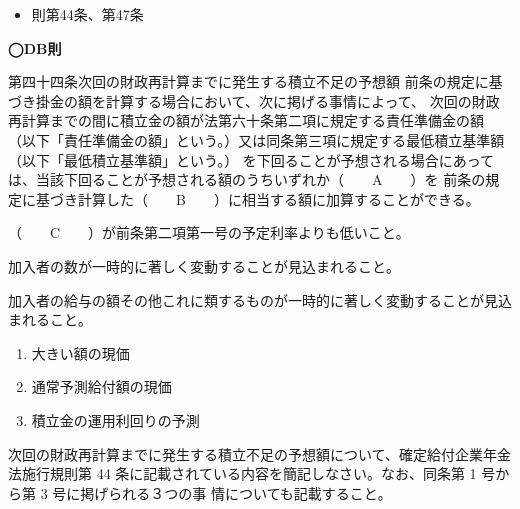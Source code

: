 \begin{InyouJobunbox}
  \begin{itemize}
    \item 則第44条、第47条
  \end{itemize}
\end{InyouJobunbox}

\begin{fillblank}[数理人試験 2025 問題1 設問2 E〜G]
  \noindent \textbf{◯DB則}
  \begin{lawstructure}
    \begin{lawarticle}{第四十四条}{次回の財政再計算までに発生する積立不足の予想額}
      前条の規定に基づき掛金の額を計算する場合において、次に掲げる事情によって、
      次回の財政再計算までの間に積立金の額が法第六十条第二項に規定する責任準備金の額
      （以下「責任準備金の額」という。）又は同条第三項に規定する最低積立基準額（以下「最低積立基準額」という。）
      を下回ることが予想される場合にあっては、当該下回ることが予想される額のうちいずれか（　　A　　）を
      前条の規定に基づき計算した（　　B　　）に相当する額に加算することができる。

      （　　C　　）が前条第二項第一号の予定利率よりも低いこと。

      加入者の数が一時的に著しく変動することが見込まれること。

      加入者の給与の額その他これに類するものが一時的に著しく変動することが見込まれること。
    \end{lawarticle}
  \end{lawstructure}
\end{fillblank}

\begin{answerbox}
  \begin{enumerate}[A: ]
    \item 大きい額の現価
    \item 通常予測給付額の現価
    \item 積立金の運用利回りの予測
  \end{enumerate}
\end{answerbox}

\begin{shortanswer}[年金1 H27 問題2(2)]
  次回の財政再計算までに発生する積立不足の予想額について、確定給付企業年金法施行規則第
44 条に記載されている内容を簡記しなさい。なお、同条第 1 号から第 3 号に掲げられる３つの事
情についても記載すること。
\end{shortanswer}

